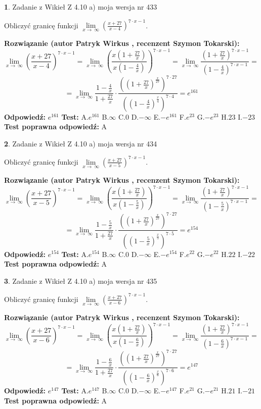 \documentclass[12pt, a4paper]{article}
\theoremstyle{definition} %
\newtheorem{zad}{}
\newcommand{\zadStart}[1]{\begin{zad}#1\newline}
\newcommand{\zadStop}{\end{zad}}
\newcommand{\rozwStart}[2]{\noindent \textbf{Rozwiązanie (autor #1 , recenzent #2): }\newline}
\newcommand{\rozwStop}{\newline}
\newcommand{\odpStart}{\noindent \textbf{Odpowiedź:}\newline}
\newcommand{\odpStop}{\newline}
\newcommand{\testStart}{\noindent \textbf{Test:}\newline}
\newcommand{\testStop}{\newline}
\newcommand{\kluczStart}{\noindent \textbf{Test poprawna odpowiedź:}\newline}
\newcommand{\kluczStop}{\newline}
\begin{document}
\zadStart{Zadanie z Wikieł Z 4.10 a) moja wersja nr 433}

Obliczyć granicę funkcji  $\lim\limits_{x\to\ \infty}(\frac{x+27}{x-4})^{7\cdot x-1}$.
\zadStop
\rozwStart{Patryk Wirkus}{Szymon Tokarski}
$$\lim\limits_{x\to\ \infty}(\frac{x+27}{x-4})^{7\cdot x-1} = \lim\limits_{x\to\ \infty}(\frac{x(1+\frac{27}{x})}{x(1-\frac{4}{x})})^{7\cdot x-1}=\lim\limits_{x\to\ \infty}\frac{(1+\frac{27}{x})^{7\cdot x-1}}{(1-\frac{4}{x})^{7\cdot x-1}}=$$
$$=\lim\limits_{x\to\ \infty}\frac{1-\frac{4}{x}}{1+\frac{27}{x}}\cdot\frac{((1+\frac{27}{x})^{\frac{x}{27}})^{7\cdot27}}{((1-\frac{4}{x})^{\frac{x}{4}})^{7\cdot4}}=e^{161}$$
\rozwStop
\odpStart
$e^{161}$
\odpStop
\testStart
A.$e^{161}$ B.$\infty$ C.$0$ D.$-\infty$ E.$-e^{161}$
F.$e^{23}$ G.$-e^{23}$
H.$23$
I.$-23$
\testStop
\kluczStart
A
\kluczStop



\zadStart{Zadanie z Wikieł Z 4.10 a) moja wersja nr 434}

Obliczyć granicę funkcji  $\lim\limits_{x\to\ \infty}(\frac{x+27}{x-5})^{7\cdot x-1}$.
\zadStop
\rozwStart{Patryk Wirkus}{Szymon Tokarski}
$$\lim\limits_{x\to\ \infty}(\frac{x+27}{x-5})^{7\cdot x-1} = \lim\limits_{x\to\ \infty}(\frac{x(1+\frac{27}{x})}{x(1-\frac{5}{x})})^{7\cdot x-1}=\lim\limits_{x\to\ \infty}\frac{(1+\frac{27}{x})^{7\cdot x-1}}{(1-\frac{5}{x})^{7\cdot x-1}}=$$
$$=\lim\limits_{x\to\ \infty}\frac{1-\frac{5}{x}}{1+\frac{27}{x}}\cdot\frac{((1+\frac{27}{x})^{\frac{x}{27}})^{7\cdot27}}{((1-\frac{5}{x})^{\frac{x}{5}})^{7\cdot5}}=e^{154}$$
\rozwStop
\odpStart
$e^{154}$
\odpStop
\testStart
A.$e^{154}$ B.$\infty$ C.$0$ D.$-\infty$ E.$-e^{154}$
F.$e^{22}$ G.$-e^{22}$
H.$22$
I.$-22$
\testStop
\kluczStart
A
\kluczStop



\zadStart{Zadanie z Wikieł Z 4.10 a) moja wersja nr 435}

Obliczyć granicę funkcji  $\lim\limits_{x\to\ \infty}(\frac{x+27}{x-6})^{7\cdot x-1}$.
\zadStop
\rozwStart{Patryk Wirkus}{Szymon Tokarski}
$$\lim\limits_{x\to\ \infty}(\frac{x+27}{x-6})^{7\cdot x-1} = \lim\limits_{x\to\ \infty}(\frac{x(1+\frac{27}{x})}{x(1-\frac{6}{x})})^{7\cdot x-1}=\lim\limits_{x\to\ \infty}\frac{(1+\frac{27}{x})^{7\cdot x-1}}{(1-\frac{6}{x})^{7\cdot x-1}}=$$
$$=\lim\limits_{x\to\ \infty}\frac{1-\frac{6}{x}}{1+\frac{27}{x}}\cdot\frac{((1+\frac{27}{x})^{\frac{x}{27}})^{7\cdot27}}{((1-\frac{6}{x})^{\frac{x}{6}})^{7\cdot6}}=e^{147}$$
\rozwStop
\odpStart
$e^{147}$
\odpStop
\testStart
A.$e^{147}$ B.$\infty$ C.$0$ D.$-\infty$ E.$-e^{147}$
F.$e^{21}$ G.$-e^{21}$
H.$21$
I.$-21$
\testStop
\kluczStart
A
\kluczStop
\end{document}
